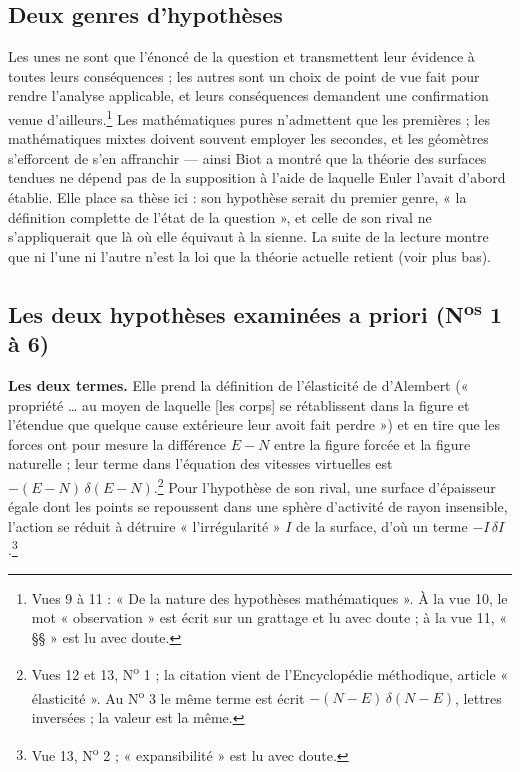 \documentclass[11pt,a4paper]{article}
\begin{document}
\subsection*{Deux genres d'hypothèses}

Les unes ne sont que l'énoncé de la question et transmettent leur évidence à
toutes leurs conséquences ; les autres sont un choix de point de vue fait pour
rendre l'analyse applicable, et leurs conséquences demandent une confirmation
venue d'ailleurs.\footnote{Vues 9 à 11 : « De la nature des hypothèses
mathématiques ». À la vue 10, le mot « observation » est écrit sur un grattage
et lu avec doute ; à la vue 11, « §§ » est lu avec doute.} Les mathématiques
pures n'admettent que les premières ; les mathématiques mixtes doivent souvent
employer les secondes, et les géomètres s'efforcent de s'en affranchir — ainsi
Biot a montré que la théorie des surfaces tendues ne dépend pas de la
supposition à l'aide de laquelle Euler l'avait d'abord établie. Elle place sa
thèse ici : son hypothèse serait du premier genre, « la définition complette de
l'état de la question », et celle de son rival ne s'appliquerait que là où elle
équivaut à la sienne. La suite de la lecture montre que ni l'une ni l'autre
n'est la loi que la théorie actuelle retient (voir plus bas).

\subsection*{Les deux hypothèses examinées a priori (N\textsuperscript{os} 1 à 6)}

\textbf{Les deux termes.} Elle prend la définition de l'élasticité de
d'Alembert (« propriété … au moyen de laquelle [les corps] se rétablissent
dans la figure et l'étendue que quelque cause extérieure leur avoit fait
perdre ») et en tire que les forces ont pour mesure la différence $E - N$ entre
la figure forcée et la figure naturelle ; leur terme dans l'équation des
vitesses virtuelles est $-(E-N)\,\delta(E-N)$.\footnote{Vues 12 et 13,
N\textsuperscript{o} 1 ; la citation vient de l'Encyclopédie méthodique,
article « élasticité ». Au N\textsuperscript{o} 3 le même terme est écrit
$-(N-E)\,\delta(N-E)$, lettres inversées ; la valeur est la même.} Pour
l'hypothèse de son rival, une surface d'épaisseur égale dont les points se
repoussent dans une sphère d'activité de rayon insensible, l'action se réduit à
détruire « l'irrégularité » $I$ de la surface, d'où un terme
$-I\,\delta I$.\footnote{Vue 13, N\textsuperscript{o} 2 ; « expansibilité » est
lu avec doute.}
\end{document}
